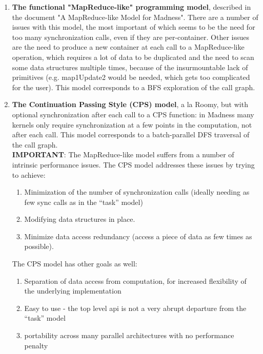 \documentclass{article}
\begin{document}
\begin{enumerate} 

\item {\bf The functional "MapReduce-like" programming model}, described in the
document "A MapReduce-like Model for Madness". There are a number of issues
with this model, the most important of which seems to be the need for too many
synchronization calls, even if they are per-container. Other issues are the
need to produce a new container at each call to a MapReduce-like operation,
which requires a lot of data to be duplicated and the need to scan some data
structures multiple times, because of the insurmountable lack of primitives
(e.g. map1Update2 would be needed, which gets too complicated for the user).
This model corresponds to a BFS exploration of the call graph.

\item {\bf The Continuation Passing Style (CPS) model}, a la Roomy, but with
optional synchronization after each call to a CPS function: in Madness many
kernels only require synchronization at a few points in the computation, not
after each call. This model corresponds to a batch-parallel DFS traversal of
the call graph.\\

{\bf IMPORTANT}: The MapReduce-like model suffers from a number of intrinsic
performance issues. The CPS model addresses these issues by trying to
achieve:
  \begin{enumerate}
      \item Minimization of the number of synchronization calls (ideally
      needing as few sync calls as in the ``task'' model)
      \item Modifying data structures in place.
      \item Minimize data access redundancy (access a piece of data
      as few times as possible).
  \end{enumerate}

 The CPS model has other goals as well:
  \begin{enumerate}
      \item Separation of data access from computation, for increased
flexibility of the underlying implementation
      \item Easy to use - the top level api is not a very abrupt departure
from the ``task'' model
      \item portability across many parallel architectures with no performance 
penalty 
  \end{enumerate}


\end{enumerate}
\end{document}
